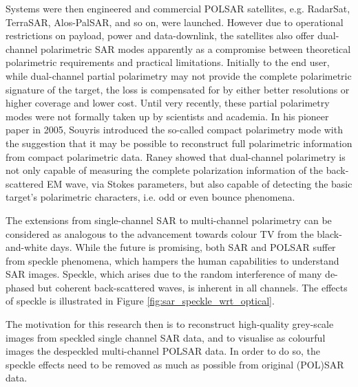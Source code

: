 Systems were then engineered and commercial POLSAR satellites, e.g. RadarSat, TerraSAR, Alos-PalSAR, and so on, were launched.
However due to operational restrictions on payload, power and data-downlink, the satellites also offer dual-channel polarimetric SAR modes apparently as a compromise between theoretical polarimetric requirements and practical limitations.
Initially to the end user, while dual-channel partial polarimetry may not provide the complete polarimetric signature of the target, the loss is compensated for by either better resolutions or higher coverage and lower cost.
Until very recently, these partial polarimetry modes were not formally taken up by scientists and academia. 
In his pioneer paper in 2005, Souyris\cite{Souyris_2005_TGRS} introduced the so-called compact polarimetry mode with the suggestion that it may be possible to reconstruct full polarimetric information from compact polarimetric data.
Raney\cite{Raney_2006_IGARSS} showed that dual-channel polarimetry is not only capable of measuring the complete polarization information of the back-scattered EM wave, via Stokes parameters, but also capable of detecting the basic target's polarimetric characters, i.e. odd or even bounce phenomena.

The extensions from single-channel SAR to multi-channel polarimetry can be considered as analogous to the advancement towards colour TV from the black-and-white days.
While the future is promising, both SAR and POLSAR suffer from speckle phenomena, which hampers the human capabilities to understand SAR images.
Speckle, which arises due to the random interference of many de-phased but coherent back-scattered waves, is inherent in all channels.
The effects of speckle is illustrated in Figure \ref{fig:sar_speckle_wrt_optical}.


The motivation for this research then is to reconstruct high-quality grey-scale images from speckled single channel SAR data, and to visualise as colourful images the despeckled multi-channel POLSAR data.
In order to do so, the speckle effects need to be removed as much as possible from original (POL)SAR data.

